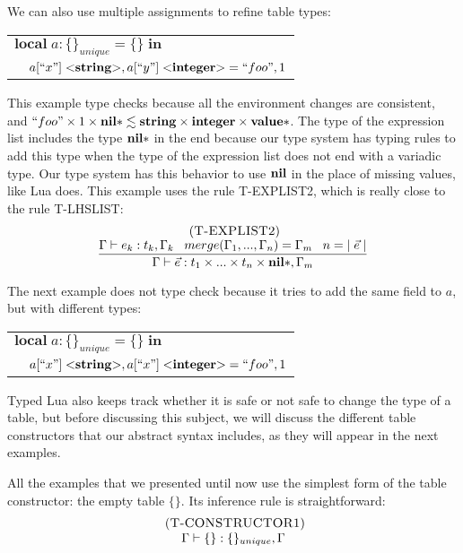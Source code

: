 We can also use multiple assignments to refine table types:
\begin{center}
\begin{tabular}{ll}
\multicolumn{2}{l}{$\mathbf{local} \; a:\{\}_{unique} = \{\} \; \mathbf{in}$}\\
& \multicolumn{1}{l}{$a[``x"] \; {<}\mathbf{string}{>}, a[``y"] \; {<}\mathbf{integer}{>} = ``foo", 1$}\\
\end{tabular}
\end{center}

This example type checks because all the environment changes are consistent, and
$``foo" \times 1 \times \mathbf{nil}{*} \lesssim \mathbf{string} \times \mathbf{integer} \times \mathbf{value}{*}$.
The type of the expression list includes the type $\mathbf{nil}{*}$ in the end
because our type system has typing rules to add this type when
the type of the expression list does not end with a variadic type.
Our type system has this behavior to use $\mathbf{nil}$ in the place of missing
values, like Lua does.
This example uses the rule \textsc{T-EXPLIST2}, which is really close
to the rule \textsc{T-LHSLIST}:
\[
\begin{array}{c}
\; (\textsc{T-EXPLIST2})\\
\dfrac{\Gamma \vdash e_{k}:t_{k}, \Gamma_{k} \;\;\;
       merge(\Gamma_{1}, ..., \Gamma_{n}) = \Gamma_{m} \;\;\;
       n = |\;\vec{e}\;|}
      {\Gamma \vdash \vec{e}:t_{1} \times ... \times t_{n} \times \mathbf{nil}{*}, \Gamma_{m}}
\end{array}
\]

The next example does not type check because it tries to add
the same field to $a$, but with different types:
\begin{center}
\begin{tabular}{ll}
\multicolumn{2}{l}{$\mathbf{local} \; a:\{\}_{unique} = \{\} \; \mathbf{in}$}\\
& \multicolumn{1}{l}{$a[``x"] \; {<}\mathbf{string}{>}, a[``x"] \; {<}\mathbf{integer}{>} = ``foo", 1$}\\
\end{tabular}
\end{center}

Typed Lua also keeps track whether it is safe or not safe to
change the type of a table, but before discussing this subject,
we will discuss the different table constructors that our
abstract syntax includes, as they will appear in the next
examples.

All the examples that we presented until now use the simplest form of
the table constructor: the empty table $\{\}$.
Its inference rule is straightforward:
\[
\begin{array}{c}
\; (\textsc{T-CONSTRUCTOR1})\\
\Gamma \vdash \{\}:\{\}_{unique}, \Gamma
\end{array}
\]

